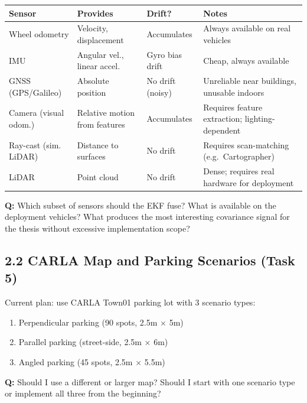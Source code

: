 \documentclass[11pt,a4paper]{article}
\newcommand{\question}[1]{\textcolor{question}{\textbf{Q:}} #1}
\begin{document}
\begin{table}[h]
\centering
\small
\begin{tabularx}{\textwidth}{@{}lllX@{}}
\toprule
\textbf{Sensor} & \textbf{Provides} & \textbf{Drift?} & \textbf{Notes} \\
\midrule
Wheel odometry & Velocity, displacement & Accumulates & Always available on real vehicles \\
\addlinespace
IMU & Angular vel., linear accel. & Gyro bias drift & Cheap, always available \\
\addlinespace
GNSS (GPS/Galileo) & Absolute position & No drift (noisy) & Unreliable near buildings, unusable indoors \\
\addlinespace
Camera (visual odom.) & Relative motion from features & Accumulates & Requires feature extraction; lighting-dependent \\
\addlinespace
Ray-cast (sim. LiDAR) & Distance to surfaces & No drift & Requires scan-matching (e.g.\ Cartographer) \\
\addlinespace
LiDAR & Point cloud & No drift & Dense; requires real hardware for deployment \\
\bottomrule
\end{tabularx}
\end{table}

\question{Which subset of sensors should the EKF fuse? What is available on the deployment vehicles? What produces the most interesting covariance signal for the thesis without excessive implementation scope?}

\bigskip
\subsection*{2.2 CARLA Map and Parking Scenarios (Task 5)}

Current plan: use CARLA Town01 parking lot with 3 scenario types:

\begin{enumerate}[leftmargin=*]
  \item Perpendicular parking (90\textdegree{} spots, 2.5m $\times$ 5m)
  \item Parallel parking (street-side, 2.5m $\times$ 6m)
  \item Angled parking (45\textdegree{} spots, 2.5m $\times$ 5.5m)
\end{enumerate}

\question{Should I use a different or larger map? Should I start with one scenario type or implement all three from the beginning?}
\end{document}
